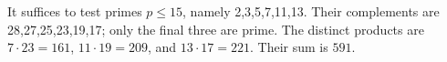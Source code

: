 It suffices to test primes $p\le15$, namely 2,3,5,7,11,13. Their complements are 28,27,25,23,19,17; only the final three are prime. The distinct products are $7\cdot23=161$, $11\cdot19=209$, and $13\cdot17=221$. Their sum is $\boxed{591}$.

